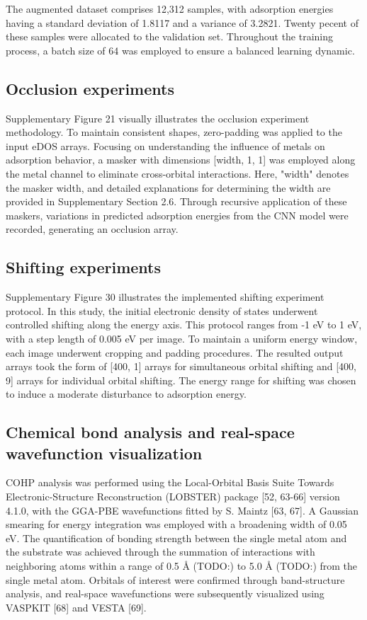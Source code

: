 The augmented dataset comprises 12,312 samples, with adsorption energies having a standard deviation of 1.8117 and a variance of 3.2821.
Twenty pecent of these samples were allocated to the validation set. Throughout the training process, a batch size of 64 was employed to ensure a balanced learning dynamic.


\subsection{Occlusion experiments}
Supplementary Figure 21 visually illustrates the occlusion experiment methodology. To maintain consistent shapes, zero-padding was applied to the input eDOS arrays.
Focusing on understanding the influence of metals on adsorption behavior, a masker with dimensions [width, 1, 1] was employed along the metal channel to eliminate cross-orbital interactions.
Here, "width" denotes the masker width, and detailed explanations for determining the width are provided in Supplementary Section 2.6.
Through recursive application of these maskers, variations in predicted adsorption energies from the CNN model were recorded, generating an occlusion array.


\subsection{Shifting experiments}
Supplementary Figure 30 illustrates the implemented shifting experiment protocol.
In this study, the initial electronic density of states underwent controlled shifting along the energy axis.
This protocol ranges from -1 eV to 1 eV, with a step length of 0.005 eV per image.
To maintain a uniform energy window, each image underwent cropping and padding procedures.
The resulted output arrays took the form of [400, 1] arrays for simultaneous orbital shifting and [400, 9] arrays for individual orbital shifting.
The energy range for shifting was chosen to induce a moderate disturbance to adsorption energy.


\subsection{Chemical bond analysis and real-space wavefunction visualization}
COHP analysis was performed using the Local-Orbital Basis Suite Towards Electronic-Structure Reconstruction (LOBSTER) package  [52, 63-66] version 4.1.0, with the GGA-PBE wavefunctions fitted by S. Maintz [63, 67].
A Gaussian smearing for energy integration was employed with a broadening width of 0.05 eV.
The quantification of bonding strength between the single metal atom and the substrate was achieved through the summation of interactions with neighboring atoms within a range of 0.5 Å (TODO:) to 5.0 Å (TODO:) from the single metal atom.
Orbitals of interest were confirmed through band-structure analysis, and real-space wavefunctions were subsequently visualized using VASPKIT [68] and VESTA [69].


